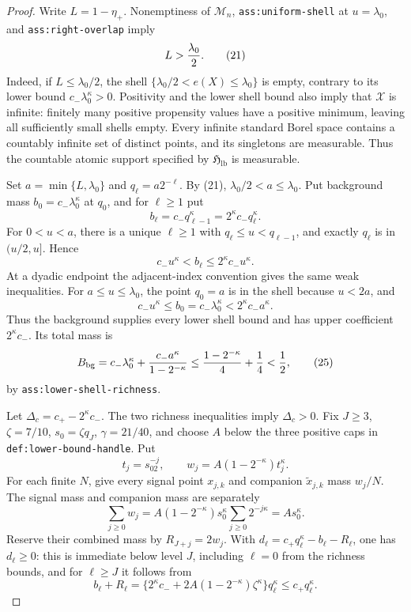 \documentclass{article}
\begin{document}
\begin{proof}
Write \(L=1-\eta_+\).  Nonemptiness of \(\mathcal M_n\),
\texttt{ass:uniform-shell} at \(u=\lambda_0\), and
\texttt{ass:right-overlap} imply
\[
L>{\lambda_0\over2}.                                      \tag{21}
\]
Indeed, if \(L\leq\lambda_0/2\), the shell
\(\{\lambda_0/2<e(X)\leq\lambda_0\}\) is empty, contrary to its lower bound
\(c_-\lambda_0^\kappa>0\).  Positivity and the lower shell bound also imply
that \(\mathcal X\) is infinite: finitely many positive propensity values have
a positive minimum, leaving all sufficiently small shells empty.  Every
infinite standard Borel space contains a countably infinite set of distinct
points, and its singletons are measurable.  Thus the countable atomic support
specified by \(\mathfrak H_{\mathrm{lb}}\) is measurable.

Set \(a=\min\{L,\lambda_0\}\) and \(q_\ell=a2^{-\ell}\).  By (21),
\(\lambda_0/2<a\leq\lambda_0\).  Put background mass
\(b_0=c_-\lambda_0^\kappa\) at \(q_0\), and for \(\ell\geq1\) put
\[
b_\ell=c_-q_{\ell-1}^\kappa=2^\kappa c_-q_\ell^\kappa.     \tag{22}
\]
For \(0<u<a\), there is a unique \(\ell\geq1\) with
\(q_\ell\leq u<q_{\ell-1}\), and exactly \(q_\ell\) is in \((u/2,u]\).
Hence
\[
c_-u^\kappa<b_\ell\leq2^\kappa c_-u^\kappa.               \tag{23}
\]
At a dyadic endpoint the adjacent-index convention gives the same weak
inequalities.  For \(a\leq u\leq\lambda_0\), the point \(q_0=a\) is in the
shell because \(u<2a\), and
\[
c_-u^\kappa\leq b_0=c_-\lambda_0^\kappa
<2^\kappa c_-a^\kappa.                                    \tag{24}
\]
Thus the background supplies every lower shell bound and has upper coefficient
\(2^\kappa c_-\).  Its total mass is
\[
B_{\mathrm{bg}}
=c_-\lambda_0^\kappa+{c_-a^\kappa\over1-2^{-\kappa}}
\leq {1-2^{-\kappa}\over4}+{1\over4}< {1\over2},           \tag{25}
\]
by \texttt{ass:lower-shell-richness}.

Let \(\Delta_c=c_+-2^\kappa c_-\).  The two richness inequalities imply
\(\Delta_c>0\).  Fix \(J\geq3\), \(\zeta=7/10\),
\(s_0=\zeta q_J\), \(\gamma=21/40\), and choose \(A\) below the three positive
caps in \texttt{def:lower-bound-handle}.  Put
\[
t_j=s_02^{-j},\quad\quad w_j=A(1-2^{-\kappa})t_j^\kappa.
\]
For each finite \(N\), give every signal point \(x_{j,k}\) and companion
\(\widetilde x_{j,k}\) mass \(w_j/N\).  The signal mass and companion mass are
separately
\[
\sum_{j\geq0}w_j
=A(1-2^{-\kappa})s_0^\kappa\sum_{j\geq0}2^{-j\kappa}
=As_0^\kappa.                                            \tag{26}
\]
Reserve their combined mass by \(R_{J+j}=2w_j\).  With
\(d_\ell=c_+q_\ell^\kappa-b_\ell-R_\ell\), one has
\(d_\ell\geq0\): this is immediate below level \(J\), including \(\ell=0\)
from the richness bounds, and for \(\ell\geq J\) it follows from
\[
b_\ell+R_\ell
=\{2^\kappa c_-+2A(1-2^{-\kappa})\zeta^\kappa\}q_\ell^\kappa
\leq c_+q_\ell^\kappa.                                    \tag{27}
\]


\end{proof}
\end{document}
